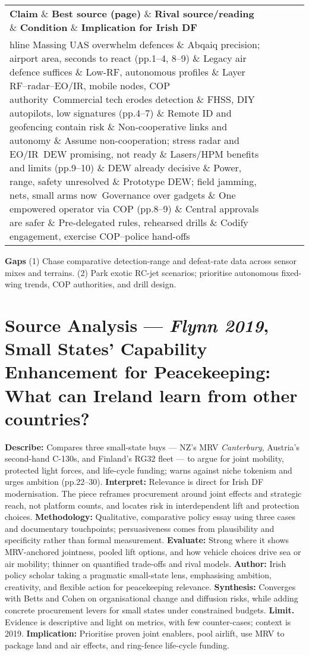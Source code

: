  
\begin{tabular}{p{3.2cm}p{4.2cm}p{3.6cm}p{3.2cm}p{4.2cm}}
	\textbf{Claim} \& \textbf{Best source (page)} \& \textbf{Rival source/reading} \& \textbf{Condition} \& \textbf{Implication for Irish DF}\\hline
	Massing UAS overwhelm defences \& Abqaiq precision; airport area, seconds to react (pp.1–4, 8–9) \& Legacy air defence suffices \& Low-RF, autonomous profiles \& Layer RF–radar–EO/IR, mobile nodes, COP authority\
	Commercial tech erodes detection \& FHSS, DIY autopilots, low signatures (pp.4–7) \& Remote ID and geofencing contain risk \& Non-cooperative links and autonomy \& Assume non-cooperation; stress radar and EO/IR\
	DEW promising, not ready \& Lasers/HPM benefits and limits (pp.9–10) \& DEW already decisive \& Power, range, safety unresolved \& Prototype DEW; field jamming, nets, small arms now\
	Governance over gadgets \& One empowered operator via COP (pp.8–9) \& Central approvals are safer \& Pre-delegated rules, rehearsed drills \& Codify engagement, exercise COP–police hand-offs\
\end{tabular}


\textbf{Gaps}
(1) Chase comparative detection-range and defeat-rate data across sensor mixes and terrains.
(2) Park exotic RC-jet scenarios; prioritise autonomous fixed-wing trends, COP authorities, and drill design.

\parencite{FLYNN_2019}
\section*{Source Analysis — \textit{Flynn 2019}, Small States’ Capability Enhancement for Peacekeeping: What can Ireland learn from other countries?}
\textbf{Describe:} Compares three small-state buys — NZ’s MRV \textit{Canterbury}, Austria’s second-hand C-130s, and Finland’s RG32 fleet — to argue for joint mobility, protected light forces, and life-cycle funding; warns against niche tokenism and urges ambition (pp.22–30).
\textbf{Interpret:} Relevance is direct for Irish DF modernisation. The piece reframes procurement around joint effects and strategic reach, not platform counts, and locates risk in interdependent lift and protection choices.
\textbf{Methodology:} Qualitative, comparative policy essay using three cases and documentary touchpoints; persuasiveness comes from plausibility and specificity rather than formal measurement.
\textbf{Evaluate:} Strong where it shows MRV-anchored jointness, pooled lift options, and how vehicle choices drive sea or air mobility; thinner on quantified trade-offs and rival models.
\textbf{Author:} Irish policy scholar taking a pragmatic small-state lens, emphasising ambition, creativity, and flexible action for peacekeeping relevance.
\textbf{Synthesis:} Converges with Betts and Cohen on organisational change and diffusion risks, while adding concrete procurement levers for small states under constrained budgets.
\textbf{Limit.} Evidence is descriptive and light on metrics, with few counter-cases; context is 2019.
\textbf{Implication:} Prioritise proven joint enablers, pool airlift, use MRV to package land and air effects, and ring-fence life-cycle funding.

